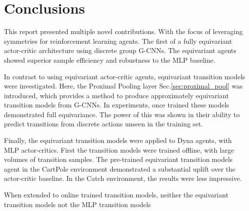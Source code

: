 \chapter{Conclusions}\label{sec:conclusions}
This report presented multiple novel contributions. With the focus of leveraging symmetries for reinforcement learning agents. The first of a fully equivariant actor-critic architecture using discrete group G-CNNs. The equivariant agents showed superior sample efficiency and robustness to the MLP baseline.

In contrast to using equivariant actor-critic agents, equivariant transition models were investigated. Here, the Proximal Pooling layer Sec.\ref{sec:proximal_pool} was introduced, which provides a method to produce approximately equivariant transition models from G-CNNs. In experiments, once trained these models demonstrated full equivariance. The power of this was shown in their ability to predict transitions from discrete actions unseen in the training set.

Finally, the equivariant transition models were applied to Dyna agents, with MLP actor-critics. First the transition models were trained offline, with large volumes of transition samples. The pre-trained equivariant transition models agent in the CartPole environment demonstrated a substantial uplift over the actor-critic baseline. In the Catch environment, the results were less impressive.

When extended to online trained transition models, neither the equivariant transition models not the MLP transition models
